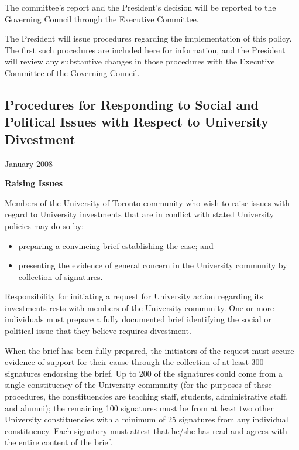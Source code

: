 \documentclass[10pt]{article}
\begin{document}
 

The committee’s report and the President’s decision will be reported to the Governing Council through the Executive Committee.

 

The President will issue procedures regarding the implementation of this policy. The first such procedures are included here for information, and the President will review any substantive changes in those procedures with the Executive Committee of the Governing Council.
	


\clearpage


	
	\subsection{Procedures for Responding to Social and Political Issues with Respect to University Divestment}
	\label{ProceduresResponding}
	
	
January 2008


\textbf{Raising Issues}

 

Members of the University of Toronto community who wish to raise issues with regard to University investments that are in conflict with stated University policies may do so by:
\begin{itemize}
	\item preparing a convincing brief establishing the case; and
	\item presenting the evidence of general concern in the University community by collection of signatures.
\end{itemize}
Responsibility for initiating a request for University action regarding its investments rests with members of the University community. One or more individuals must prepare a fully documented brief identifying the social or political issue that they believe requires divestment.

 

When the brief has been fully prepared, the initiators of the request must secure evidence of support for their cause through the collection of at least 300 signatures endorsing the brief. Up to 200 of the signatures could come from a single constituency of the University community (for the purposes of these procedures, the constituencies are teaching staff, students, administrative staff, and alumni); the remaining 100 signatures must be from at least two other University constituencies with a minimum of 25 signatures from any individual constituency.  Each signatory must attest that he/she has read and agrees with the entire content of the brief.
\end{document}
